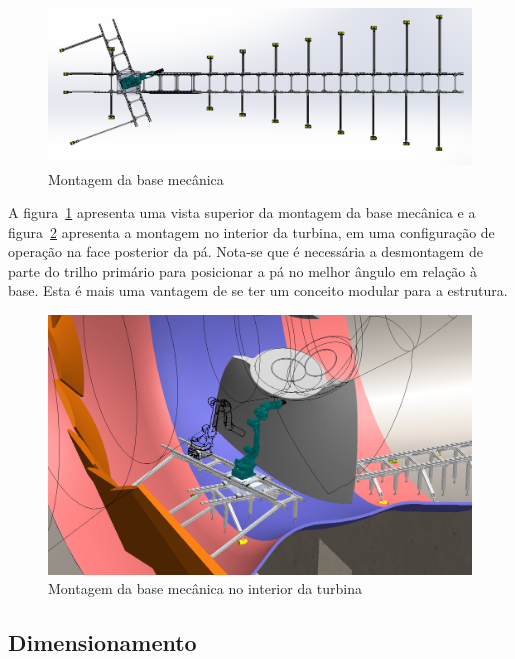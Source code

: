 \begin{figure}[h!]
	\centering
	\includegraphics[width=0.9\columnwidth]{figs/construcao/EMMA_Base_Secundaria_04}
	\caption{Montagem da base mecânica}
    \label{fig::EMMA_Base_Secundaria_04}
\end{figure}

A figura~\ref{fig::EMMA_Base_Secundaria_04} apresenta uma vista superior da
montagem da base mecânica e a figura~\ref{fig::EMMA_Base_Secundaria_01}
apresenta a montagem no interior da turbina, em uma configuração de operação na
face posterior da pá. Nota-se que é necessária a desmontagem de parte do trilho
primário para posicionar a pá no melhor ângulo em relação à base. Esta é mais
uma vantagem de se ter um conceito modular para a estrutura.

\begin{figure}[h!]
	\centering
	\includegraphics[width=0.9\columnwidth]{figs/construcao/EMMA_Base_Secundaria_01}
	\caption{Montagem da base mecânica no interior da turbina}
    \label{fig::EMMA_Base_Secundaria_01}
\end{figure}

\subsection{Dimensionamento}

